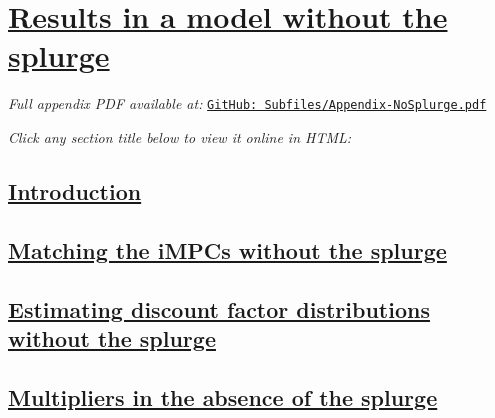 \documentclass[titlepage, headings=optiontotocandhead]{econark} %
\begin{document}
\clearpage
\FloatBarrier
{}
{}\section{\href{\WebBase\#app:Model-without-splurge}{Results in a model without the splurge}}
\label{app:Model-without-splurge}

\noindent\textit{Full appendix PDF available at:}
\href{https://github.com/econ-ark/HAFiscal/blob/master/Subfiles/Appendix-NoSplurge.pdf}{\texttt{GitHub: Subfiles/Appendix-NoSplurge.pdf}}

\medskip
\noindent\textit{Click any section title below to view it online in HTML:}

\medskip

\subsection{\href{\WebBase\#app:Model-without-splurge-intro}{Introduction}}
\label{app:Model-without-splurge-intro}

\subsection{\href{\WebBase\#app:nosplurge-matching-impcs}{Matching the iMPCs without the splurge}}
\label{app:nosplurge-matching-impcs}

\subsection{\href{\WebBase\#app:nosplurge-estimating-betas}{Estimating discount factor distributions without the splurge}}
\label{app:nosplurge-estimating-betas}

\subsection{\href{\WebBase\#app:nosplurge-multipliers}{Multipliers in the absence of the splurge}}
\label{app:nosplurge-multipliers}

\medskip

\begin{hiddencontent}[OnlineAppendix]
  
\end{hiddencontent}
\end{document}
